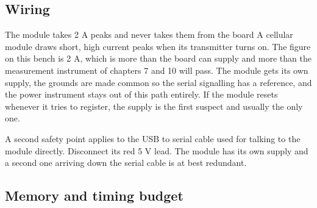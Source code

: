 \subsection*{Wiring}


\begin{note}{The module takes 2 A peaks and never takes them from the board}
A cellular module draws short, high current peaks when its transmitter turns on.
The figure on this bench is 2 A, which is more than the board can supply and
more than the measurement instrument of chapters 7 and 10 will pass. The module
gets its own supply, the grounds are made common so the serial signalling has a
reference, and the power instrument stays out of this path entirely. If the
module resets whenever it tries to register, the supply is the first suspect and
usually the only one.
\end{note}

A second safety point applies to the USB to serial cable used for talking to the
module directly. Disconnect its red 5 V lead. The module has its own supply and
a second one arriving down the serial cable is at best redundant.

\subsection*{Memory and timing budget}


